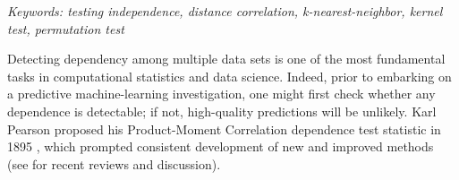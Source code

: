 \documentclass[11pt]{article}
\begin{document}
\noindent%
{\it Keywords: testing independence, distance correlation, k-nearest-neighbor, kernel test, permutation test}

\clearpage
\setcounter{tocdepth}{2}%








Detecting dependency among multiple data sets is one of the most fundamental tasks in computational statistics and data science.
Indeed, prior to embarking on a predictive machine-learning investigation, one might first check whether any dependence is detectable; if not, high-quality predictions will be unlikely.
Karl Pearson proposed his Product-Moment Correlation dependence test statistic in 1895 \cite{Pearson1895}, which prompted consistent development of  new and improved methods (see \cite{Reimherr2013,JosseHolmes2013} for  recent reviews and discussion).
\end{document}
